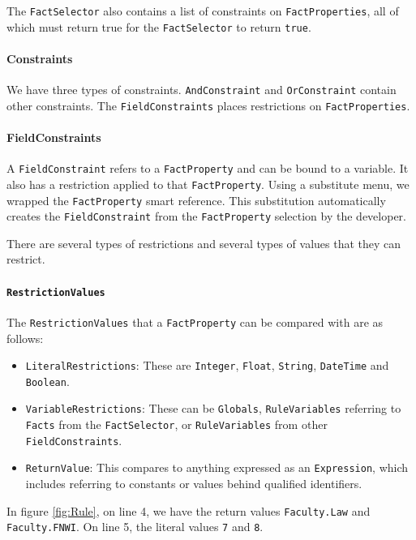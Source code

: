 The \texttt{FactSelector} also contains a list of constraints on \texttt{FactProperties}, all of which must return true for the \texttt{FactSelector} to return \texttt{true}.

\paragraph{Constraints} We have three types of constraints.
\texttt{AndConstraint} and \texttt{OrConstraint} contain other constraints.
The \texttt{FieldConstraints} places restrictions on \texttt{FactProperties}.

\paragraph{FieldConstraints} A \texttt{FieldConstraint} refers to a \texttt{FactProperty} and can be bound to a variable.
It also has a restriction applied to that \texttt{FactProperty}.
Using a substitute menu, we wrapped the \texttt{FactProperty} smart reference.
This substitution automatically creates the \texttt{FieldConstraint} from the \texttt{FactProperty} selection by the developer.

There are several types of restrictions and several types of values that they can restrict.

\paragraph{\texttt{RestrictionValues}} The \texttt{RestrictionValues} that a \texttt{FactProperty} can be compared with are as follows:
\begin{itemize}    
    \setlength\itemsep{0em}
    \item \texttt{LiteralRestrictions}: These are \texttt{Integer}, \texttt{Float}, \texttt{String}, \texttt{DateTime} and \texttt{Boolean}.
    \item \texttt{VariableRestrictions}: These can be \texttt{Globals}, \texttt{RuleVariables} referring to \texttt{Facts} from the \texttt{FactSelector}, or \texttt{RuleVariables} from other \texttt{FieldConstraints}.
    \item \texttt{ReturnValue}: This compares to anything expressed as an \texttt{Expression}, which includes referring to constants or values behind qualified identifiers.
\end{itemize}

In figure \ref{fig:Rule}, on line 4, we have the return values \texttt{Faculty.Law} and \texttt{Faculty.FNWI}.
On line 5, the literal values \texttt{7} and \texttt{8}.

